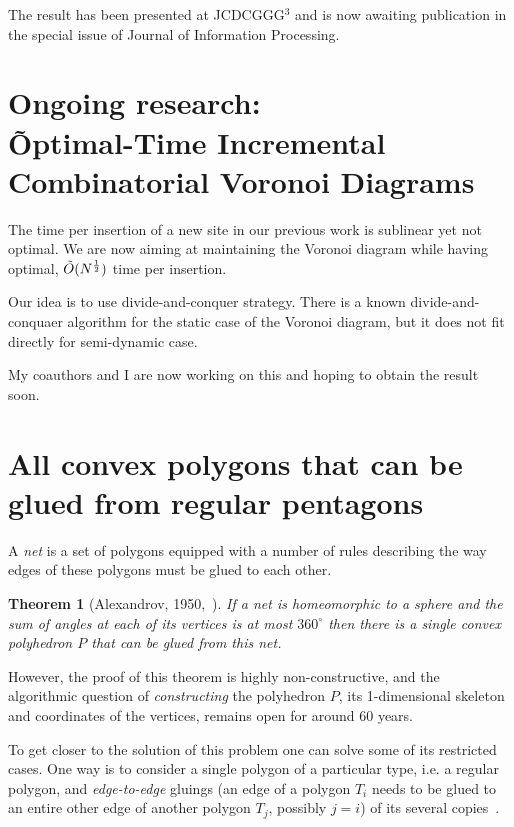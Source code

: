 \documentclass[a4paper,11pt]{article}
\newtheorem{theorem}{Theorem}
\theoremstyle{definition}
\begin{document}
The result has been presented at JCDCGGG$^3$ and is now awaiting publication in the special issue of Journal of Information Processing.

\section{Ongoing research: \\
	\~Optimal-Time Incremental Combinatorial Voronoi Diagrams}

The time per insertion of a new site in our previous work is sublinear yet not optimal. We are now aiming at maintaining the Voronoi diagram while having optimal, $\tilde O(N^{\frac12})$ time per insertion.

Our idea is to use divide-and-conquer strategy. There is a known divide-and-conquaer algorithm for the static case of the Voronoi diagram, but it does not fit directly for semi-dynamic case.

My coauthors and I are now working on this and hoping to obtain the result soon.

\section{All convex polygons that can be glued from regular pentagons}

	A \emph{net} is a set of polygons equipped with a number of rules describing the way edges of these polygons must be glued to each other.

\begin{theorem}[Alexandrov, 1950,~\cite{alex}]
\label{thm:alexandrov}
	If a net is homeomorphic to a sphere and the sum of angles at each of its vertices is at most $360^\circ$ then there is a single convex polyhedron $P$ that can be glued from this net.
\end{theorem}

However, the proof of this theorem is highly non-constructive, and the algorithmic question of \emph{constructing} the polyhedron $P$, its 1-dimensional skeleton and coordinates of the vertices, remains open for around 60 years.

To get closer to the solution of this problem one can solve some of its restricted cases. One way is to consider a single polygon of a particular type, i.e. a regular polygon, and {\it edge-to-edge} gluings (an edge of a polygon $T_i$ needs to be glued to an entire other edge of another polygon $T_j$, possibly $j=i$) of its several copies~\cite{gfalop}.
\end{document}
